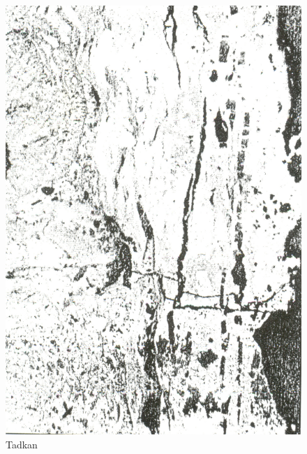 \begin{figure}[H]
\renewcommand{\thefigure}{17D}
\includegraphics[scale=0.75]{images/chapter-4/fig017D.jpg}
\caption{Tadkan}\label{chapter-4-fig17D}
\end{figure}

\newpage

